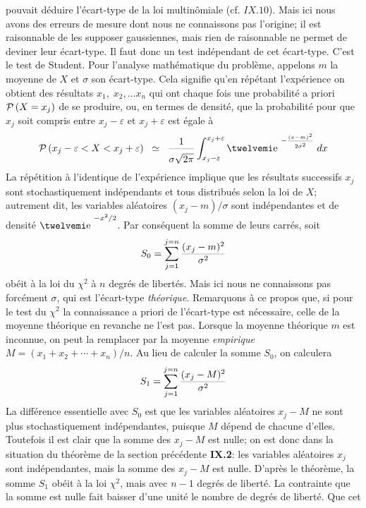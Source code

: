 pouvait d\'eduire l'\'ecart-type de la loi multin\^omiale (cf. $IX.10$). 
Mais ici nous avons des erreurs de mesure dont nous ne connaissons pas
l'origine; il est raisonnable de les supposer gaussiennes, mais rien de
raisonnable ne permet de deviner leur \'ecart-type. Il faut donc un test
ind\'ependant de cet \'ecart-type. C'est le test de Student.
\medskip
Pour l'analyse math\'ematique du probl\`eme, appelons $m$ la moyenne 
de $X$ et $\sigma$ son \'ecart-type. Cela signifie qu'en r\'ep\'etant 
l'exp\'erience on obtient des r\'esultats $x_1,\; x_2, \ldots x_n$ qui 
ont chaque fois une probabilit\'e a priori ${\cal P}\, (X=x_j)$ de se
produire, ou, en termes de densit\'e, que la probabilit\'e pour que 
$x_j$ soit compris entre $x_j-\varepsilon$ et $x_j+\varepsilon$ est
\'egale \`a
$${\cal P}\, (x_j-\varepsilon < X < x_j+\varepsilon ) \;\; \simeq
\;\; {1\over \sdown{13} \sigma\sqrt{2\pi }}\int_{x_j-\varepsilon}^{x_j+\varepsilon}
\e^{-{(x-m)^2\strup{2}\over\sdown{6.6}2\sigma^2 }}\; dx$$
La r\'ep\'etition \`a l'identique de l'exp\'erience implique que les 
r\'esultats successifs $x_j$ sont stochastiquement ind\'ependants et 
tous distribu\'es selon la loi de $X$; autrement dit, les variables
al\'eatoires $(x_j - m)/ \sigma$ sont ind\'ependantes et de densit\'e
$\e^{-x^2/2}$. Par cons\'equent la somme de leurs carr\'es, soit
$$S_{0} = \sum_{j=1}^{j=n} {(x_j - m)^2\over\sigma^2}$$
ob\'eit \`a la loi du $\chi^2$ \`a $n$ degr\'es de libert\'es.
Mais ici nous ne connaissons pas forc\'ement $\sigma$,  qui est
l'\'ecart-type {\it th\'eorique}. 
\medskip
Remarquons \`a ce propos que, si pour le test du $\chi^2$ la 
connaissance a priori de l'\'ecart-type est n\'ecessaire, celle de la
moyenne th\'eorique en revanche ne l'est pas. Lorsque la moyenne 
th\'eorique $m$ est inconnue, on peut la remplacer par la moyenne {\it
empirique} $M = (x_1 + x_2 + \cdots +x_n)/n$. Au lieu de calculer la
somme $S_0$, on calculera 
$$S_{1} = \sum_{j=1}^{j=n} {(x_j - M)^2\over\sigma^2}$$ 
La diff\'erence essentielle avec $S_0$ est que les variables al\'eatoires
$x_j - M$ ne sont plus stochastiquement ind\'ependantes,  puisque $M$
d\'epend de chacune d'elles. Toutefois il est clair que la somme des 
$x_j - M$ est nulle; on est donc dans la situation du th\'eor\`eme de la
section pr\'ec\'edente {\bf IX.2}: les variables al\'eatoires $x_j$ sont
ind\'ependantes, mais la somme des $x_j - M$ est nulle. D'apr\`es le
th\'eor\`eme, la somme $S_1$ ob\'eit \`a la loi $\chi^2$, mais avec
$n-1$ degr\'es de libert\'e. La contrainte que la somme est nulle fait
baisser d'une unit\'e le nombre de degr\'es de libert\'e. Que cet
